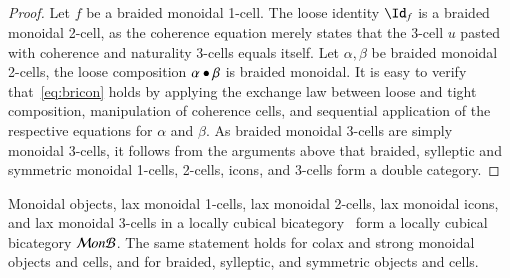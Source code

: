 \begin{proof}
Let $f$ be a braided monoidal 1-cell. The loose identity $\looseid_f$ is a braided monoidal 2-cell, as the coherence equation merely states that the 3-cell $u$ pasted with coherence and naturality 3-cells equals itself. Let $\alpha, \beta$ be braided monoidal 2-cells, the loose composition $\alpha \bullet \beta$ is braided monoidal. It is easy to verify that~\ref{eq:bricon} holds by applying the exchange law between loose and tight composition, manipulation of coherence cells, and sequential application of the respective equations for $\alpha$ and $\beta$.  As braided monoidal 3-cells are simply monoidal 3-cells, it follows from the arguments above that braided, sylleptic and symmetric monoidal 1-cells, 2-cells, icons, and 3-cells form a double category.
\end{proof}

\begin{thm}\label{thm:lcbc}
  Monoidal objects, lax monoidal 1-cells, lax monoidal 2-cells, lax monoidal icons, and lax monoidal 3-cells in a locally cubical bicategory \fB\ form a locally cubical bicategory $\mathcal{M} on\mathcal{B}$. The same statement holds for colax and strong monoidal objects and cells, and for braided, sylleptic, and symmetric objects and cells.
\end{thm}


